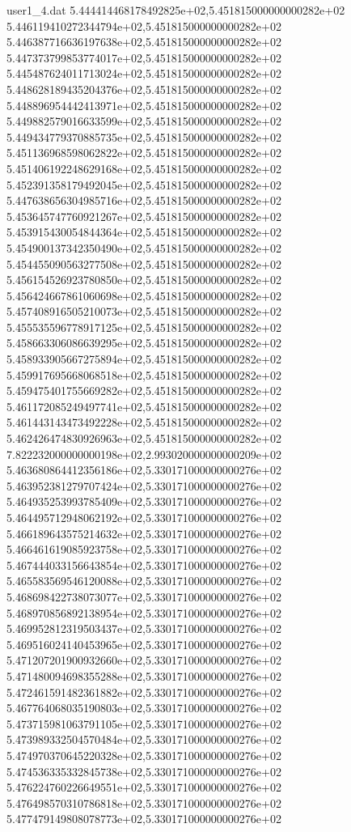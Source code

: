 \begin{filecontents}{user1_4.dat}
5.444414468178492825e+02,5.451815000000000282e+02
5.446119410272344794e+02,5.451815000000000282e+02
5.446387716636197638e+02,5.451815000000000282e+02
5.447373799853774017e+02,5.451815000000000282e+02
5.445487624011713024e+02,5.451815000000000282e+02
5.448628189435204376e+02,5.451815000000000282e+02
5.448896954442413971e+02,5.451815000000000282e+02
5.449882579016633599e+02,5.451815000000000282e+02
5.449434779370885735e+02,5.451815000000000282e+02
5.451136968598062822e+02,5.451815000000000282e+02
5.451406192248629168e+02,5.451815000000000282e+02
5.452391358179492045e+02,5.451815000000000282e+02
5.447638656304985716e+02,5.451815000000000282e+02
5.453645747760921267e+02,5.451815000000000282e+02
5.453915430054844364e+02,5.451815000000000282e+02
5.454900137342350490e+02,5.451815000000000282e+02
5.454455090563277508e+02,5.451815000000000282e+02
5.456154526923780850e+02,5.451815000000000282e+02
5.456424667861060698e+02,5.451815000000000282e+02
5.457408916505210073e+02,5.451815000000000282e+02
5.455535596778917125e+02,5.451815000000000282e+02
5.458663306086639295e+02,5.451815000000000282e+02
5.458933905667275894e+02,5.451815000000000282e+02
5.459917695668068518e+02,5.451815000000000282e+02
5.459475401755669282e+02,5.451815000000000282e+02
5.461172085249497741e+02,5.451815000000000282e+02
5.461443143473492228e+02,5.451815000000000282e+02
5.462426474830926963e+02,5.451815000000000282e+02
7.822232000000000198e+02,2.993020000000000209e+02
5.463680864412356186e+02,5.330171000000000276e+02
5.463952381279707424e+02,5.330171000000000276e+02
5.464935253993785409e+02,5.330171000000000276e+02
5.464495712948062192e+02,5.330171000000000276e+02
5.466189643575214632e+02,5.330171000000000276e+02
5.466461619085923758e+02,5.330171000000000276e+02
5.467444033156643854e+02,5.330171000000000276e+02
5.465583569546120088e+02,5.330171000000000276e+02
5.468698422738073077e+02,5.330171000000000276e+02
5.468970856892138954e+02,5.330171000000000276e+02
5.469952812319503437e+02,5.330171000000000276e+02
5.469516024140453965e+02,5.330171000000000276e+02
5.471207201900932660e+02,5.330171000000000276e+02
5.471480094698355288e+02,5.330171000000000276e+02
5.472461591482361882e+02,5.330171000000000276e+02
5.467764068035190803e+02,5.330171000000000276e+02
5.473715981063791105e+02,5.330171000000000276e+02
5.473989332504570484e+02,5.330171000000000276e+02
5.474970370645220328e+02,5.330171000000000276e+02
5.474536335332845738e+02,5.330171000000000276e+02
5.476224760226649551e+02,5.330171000000000276e+02
5.476498570310786818e+02,5.330171000000000276e+02
5.477479149808078773e+02,5.330171000000000276e+02

\end{filecontents}
